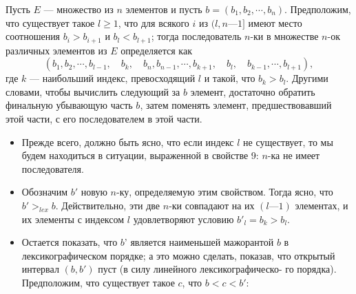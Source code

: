 \documentclass{../../template/mai_book}
\begin{document}
{\begin{property}

\hspace*{0.55cm}Пусть $E$ — множество из $n$ элементов и пусть $b = (b_1,b_2,\cdots ,b_n)$. 
Предположим, что существует такое $l \geq 1$, что для всякого $i$ из $(l, n — 1]$ 
имеют место соотношения $b_i > b_{i+1}$ и $b_l < b_{l+1}$; тогда последователь 
$n$-ки в множестве $n$-ок различных элементов из $E$ определяется как
$$
(b_1, b_2,\cdots,b_{l-1},\quad b_k,\quad b_n,b_{n-1},\cdots,b_{k+1},\quad b_l,\quad b_{k-1},\cdots,b_{l+1}),
$$
где $k$ — наибольший индекс, превосходящий $l$ и такой, что $b_k > b_l$. 
Другими словами, чтобы вычислить следующий за $b$ элемент,  
достаточно обратить финальную убывающую часть $b$, затем поменять элемент, 
предшествовавший этой части, с его последователем в этой части. 
\end{property}
\begin{myproof}
\begin{itemize}
\item Прежде всего, должно быть ясно, что если индекс $l$ не существует, 
то мы будем находиться в ситуации, выраженной в свойстве 9: $n$-ка 
не имеет последователя. 
\item Обозначим $b'$ новую $n$-ку, определяемую этим свойством. Тогда 
ясно, что $b' >_{lex} b$. Действительно, эти две $n$-ки совпадают на их 
$(l—1)$ элементах, и их элементы с индексом $l$ удовлетворяют условию 
$b'_l = b_k > b_l$. 
\item Остается показать, что $b$' является наименьшей мажорантой $b$ в 
лексикографическом порядке; а это можно сделать, показав, что  
открытый интервал $(b,b')$ пуст (в силу линейного лексикографическо- 
го порядка). Предположим, что существует такое $c$, что $b < c < b'$:
\end{itemize}


\end{myproof}}
\end{document}
